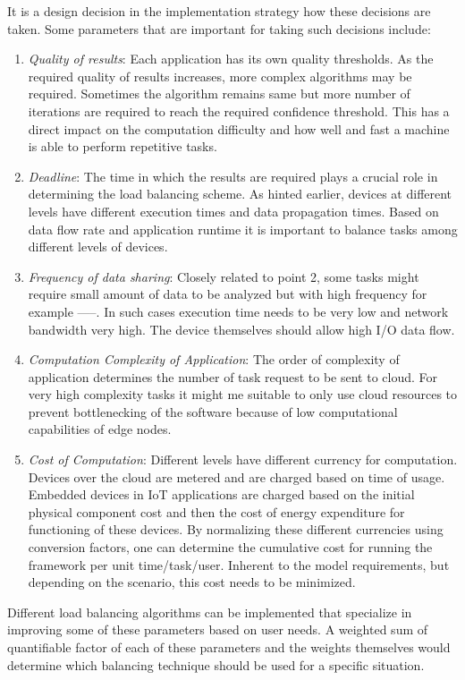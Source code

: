 \documentclass[AMA,STIX1COL]{WileyNJD-v2}
\begin{document}
It is a design decision in the implementation strategy how these decisions are taken. Some parameters that are important for taking such decisions include:
\begin{enumerate}
\item \textit{Quality of results}: Each application has its own quality thresholds. As the required quality of results increases, more complex algorithms may be required. Sometimes the algorithm remains same but more number of iterations are required to reach the required confidence threshold. This has a direct impact on the computation difficulty and how well and fast a machine is able to perform repetitive tasks.
\item \textit{Deadline}: The time in which the results are required plays a crucial role in determining the load balancing scheme. As hinted earlier, devices at different levels have different execution times and data propagation times. Based on data flow rate and application runtime it is important to balance tasks among different levels of devices.
\item \textit{Frequency of data sharing}: Closely related to point 2, some tasks might require small amount of data to be analyzed but with high frequency for example -----. In such cases execution time needs to be very low and network bandwidth very high. The device themselves should allow high I/O data flow.
\item \textit{Computation Complexity of Application}: The order of complexity of application determines the number of task request to be sent to cloud. For very high complexity tasks it might me suitable to only use cloud resources to prevent bottlenecking of the software because of low computational capabilities of edge nodes.
\item \textit{Cost of Computation}: Different levels have different currency for computation. Devices over the cloud are metered and are charged based on time of usage. Embedded devices in IoT applications are charged based on the initial physical component cost and then the cost of energy expenditure for functioning of these devices. By normalizing these different currencies using conversion factors, one can determine the cumulative cost for running the framework per unit time/task/user. Inherent to the model requirements, but depending on the scenario, this cost needs to be minimized. 
\end{enumerate}
Different load balancing algorithms can be implemented that specialize in improving some of these parameters based on user needs. A weighted sum of quantifiable factor of each of these parameters and the weights themselves would determine which balancing technique should be used for a specific situation.
\end{document}
